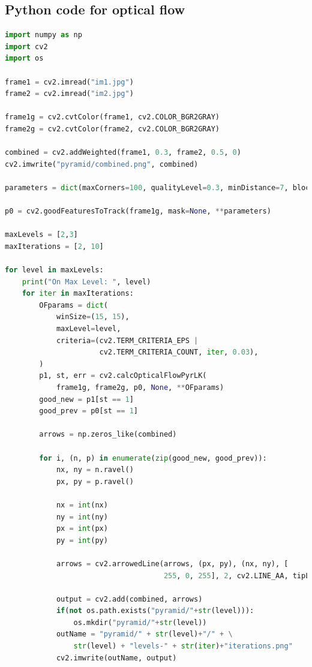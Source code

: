 \documentclass{article}
\begin{document}
    \newpage
    \begin{appendices}

        \section{Python code for optical flow}
        \label{appendix:OF}
        \begin{lstlisting}[language=Python]
import numpy as np
import cv2
import os

frame1 = cv2.imread("im1.jpg")
frame2 = cv2.imread("im2.jpg")

frame1g = cv2.cvtColor(frame1, cv2.COLOR_BGR2GRAY)
frame2g = cv2.cvtColor(frame2, cv2.COLOR_BGR2GRAY)

combined = cv2.addWeighted(frame1, 0.3, frame2, 0.5, 0)
cv2.imwrite("pyramid/combined.png", combined)

parameters = dict(maxCorners=100, qualityLevel=0.3, minDistance=7, blockSize=7)

p0 = cv2.goodFeaturesToTrack(frame1g, mask=None, **parameters)

maxLevels = [2,3]
maxIterations = [2, 10]

for level in maxLevels:
    print("On Max Level: ", level)
    for iter in maxIterations:
        OFparams = dict(
            winSize=(15, 15),
            maxLevel=level,
            criteria=(cv2.TERM_CRITERIA_EPS |
                      cv2.TERM_CRITERIA_COUNT, iter, 0.03),
        )
        p1, st, err = cv2.calcOpticalFlowPyrLK(
            frame1g, frame2g, p0, None, **OFparams)
        good_new = p1[st == 1]
        good_prev = p0[st == 1]

        arrows = np.zeros_like(combined)

        for i, (n, p) in enumerate(zip(good_new, good_prev)):
            nx, ny = n.ravel()
            px, py = p.ravel()

            nx = int(nx)
            ny = int(ny)
            px = int(px)
            py = int(py)

            arrows = cv2.arrowedLine(arrows, (px, py), (nx, ny), [
                                     255, 0, 255], 2, cv2.LINE_AA, tipLength=0.4)

            output = cv2.add(combined, arrows)
            if(not os.path.exists("pyramid/"+str(level))):
                os.mkdir("pyramid/"+str(level))
            outName = "pyramid/" + str(level)+"/" + \
                str(level) + "levels-" + str(iter)+"iterations.png"
            cv2.imwrite(outName, output)


\end{lstlisting}
\end{appendices}
\end{document}
